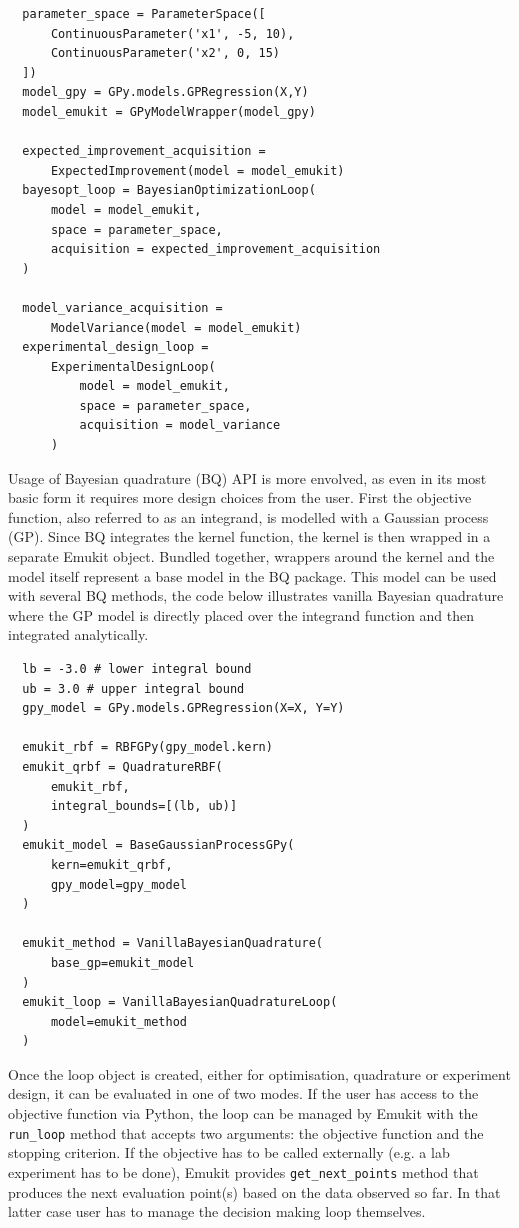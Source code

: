 \begin{verbatim}
  parameter_space = ParameterSpace([
      ContinuousParameter('x1', -5, 10),
      ContinuousParameter('x2', 0, 15)
  ])
  model_gpy = GPy.models.GPRegression(X,Y)
  model_emukit = GPyModelWrapper(model_gpy)

  expected_improvement_acquisition =
      ExpectedImprovement(model = model_emukit)
  bayesopt_loop = BayesianOptimizationLoop(
      model = model_emukit,
      space = parameter_space,
      acquisition = expected_improvement_acquisition
  )

  model_variance_acquisition =
      ModelVariance(model = model_emukit)
  experimental_design_loop =
      ExperimentalDesignLoop(
          model = model_emukit,
          space = parameter_space,
          acquisition = model_variance
      )
\end{verbatim}

Usage of Bayesian quadrature (BQ) API is more envolved, as even in its most basic form it requires more design choices from the user. First the objective function, also referred to as an integrand, is modelled with a Gaussian process (GP). Since BQ integrates the kernel function, the kernel is then wrapped in a separate Emukit object. Bundled together, wrappers around the kernel and the model itself represent a base model in the BQ package. This model can be used with several BQ methods, the code below illustrates vanilla Bayesian quadrature where the GP model is directly placed over the integrand function and then integrated analytically.

\begin{verbatim}
  lb = -3.0 # lower integral bound
  ub = 3.0 # upper integral bound
  gpy_model = GPy.models.GPRegression(X=X, Y=Y)

  emukit_rbf = RBFGPy(gpy_model.kern)
  emukit_qrbf = QuadratureRBF(
      emukit_rbf,
      integral_bounds=[(lb, ub)]
  )
  emukit_model = BaseGaussianProcessGPy(
      kern=emukit_qrbf,
      gpy_model=gpy_model
  )

  emukit_method = VanillaBayesianQuadrature(
      base_gp=emukit_model
  )
  emukit_loop = VanillaBayesianQuadratureLoop(
      model=emukit_method
  )
\end{verbatim}

Once the loop object is created, either for optimisation, quadrature or experiment design, it can be evaluated in one of two modes. If the user has access to the objective function via Python, the loop can be managed by Emukit with the \texttt{run\_loop} method that accepts two arguments: the objective function and the stopping criterion. If the objective has to be called externally (e.g. a lab experiment has to be done), Emukit provides \texttt{get\_next\_points} method that produces the next evaluation point(s) based on the data observed so far. In that latter case user has to manage the decision making loop themselves.

